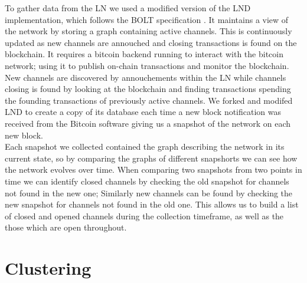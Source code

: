 To gather data from the LN we used a modified version of the LND  implementation, which follows the BOLT specification . It maintains a view of the network by storing a graph containing active channels. This is continuously updated as new channels are annouched and closing transactions is found on the blockchain. It requires a bitcoin backend running to interact with the bitcoin network; using it to publish on-chain transactions and monitor the blockchain. New channels are discovered by annouchements within the LN while channels closing is found by looking at the blockchain and finding transactions spending the founding transactions of previously active channels. We forked and modifed LND to create a copy of its database each time a new block notification was received from the Bitcoin software giving us a snapshot of the network on each new block.
\\

Each snapshot we collected contained the graph describing the network in its current state, so by comparing the graphs of different snapshorts we can see how the network evolves over time. When comparing two snapshots from two points in time we can identify closed channels by checking the old snapshot for channels not found in the new one; Similarly new channels can be found by checking the new snapshot for channels not found in the old one. This allows us to build a list of closed and opened channels during the collection timeframe, as well as the those which are open throughout. 


\section{Clustering}



